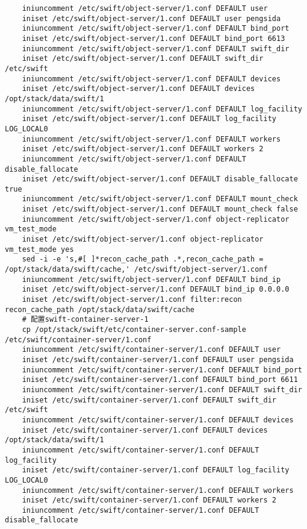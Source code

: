 \documentclass[a4paper,left=1.5cm,right=1.5cm,11pt]{article}
\begin{document}
\begin{lstlisting}
	iniuncomment /etc/swift/object-server/1.conf DEFAULT user
    iniset /etc/swift/object-server/1.conf DEFAULT user pengsida
    iniuncomment /etc/swift/object-server/1.conf DEFAULT bind_port
    iniset /etc/swift/object-server/1.conf DEFAULT bind_port 6613
    iniuncomment /etc/swift/object-server/1.conf DEFAULT swift_dir
    iniset /etc/swift/object-server/1.conf DEFAULT swift_dir /etc/swift
    iniuncomment /etc/swift/object-server/1.conf DEFAULT devices
    iniset /etc/swift/object-server/1.conf DEFAULT devices /opt/stack/data/swift/1
    iniuncomment /etc/swift/object-server/1.conf DEFAULT log_facility
    iniset /etc/swift/object-server/1.conf DEFAULT log_facility LOG_LOCAL0
    iniuncomment /etc/swift/object-server/1.conf DEFAULT workers
    iniset /etc/swift/object-server/1.conf DEFAULT workers 2
    iniuncomment /etc/swift/object-server/1.conf DEFAULT disable_fallocate
    iniset /etc/swift/object-server/1.conf DEFAULT disable_fallocate true
    iniuncomment /etc/swift/object-server/1.conf DEFAULT mount_check
    iniset /etc/swift/object-server/1.conf DEFAULT mount_check false
    iniuncomment /etc/swift/object-server/1.conf object-replicator vm_test_mode
    iniset /etc/swift/object-server/1.conf object-replicator vm_test_mode yes
    sed -i -e 's,#[ ]*recon_cache_path .*,recon_cache_path = /opt/stack/data/swift/cache,' /etc/swift/object-server/1.conf
    iniuncomment /etc/swift/object-server/1.conf DEFAULT bind_ip
    iniset /etc/swift/object-server/1.conf DEFAULT bind_ip 0.0.0.0
    iniset /etc/swift/object-server/1.conf filter:recon recon_cache_path /opt/stack/data/swift/cache
	# 配置swift-container-server-1
	cp /opt/stack/swift/etc/container-server.conf-sample /etc/swift/container-server/1.conf
	iniuncomment /etc/swift/container-server/1.conf DEFAULT user
    iniset /etc/swift/container-server/1.conf DEFAULT user pengsida
    iniuncomment /etc/swift/container-server/1.conf DEFAULT bind_port
    iniset /etc/swift/container-server/1.conf DEFAULT bind_port 6611
    iniuncomment /etc/swift/container-server/1.conf DEFAULT swift_dir
    iniset /etc/swift/container-server/1.conf DEFAULT swift_dir /etc/swift
    iniuncomment /etc/swift/container-server/1.conf DEFAULT devices
    iniset /etc/swift/container-server/1.conf DEFAULT devices /opt/stack/data/swift/1
    iniuncomment /etc/swift/container-server/1.conf DEFAULT log_facility
    iniset /etc/swift/container-server/1.conf DEFAULT log_facility LOG_LOCAL0
    iniuncomment /etc/swift/container-server/1.conf DEFAULT workers
    iniset /etc/swift/container-server/1.conf DEFAULT workers 2
    iniuncomment /etc/swift/container-server/1.conf DEFAULT disable_fallocate

\end{lstlisting}
\end{document}

